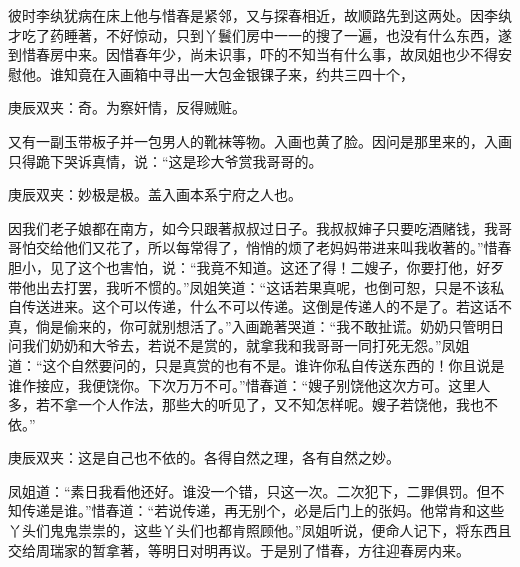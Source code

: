 \begin{parag}
\end{parag}


\begin{parag}
    彼时李纨犹病在床上他与惜春是紧邻，又与探春相近，故顺路先到这两处。因李纨才吃了药睡著，不好惊动，只到丫鬟们房中一一的搜了一遍，也没有什么东西，遂到惜春房中来。因惜春年少，尚未识事，吓的不知当有什么事，故凤姐也少不得安慰他。谁知竟在入画箱中寻出一大包金银锞子来，约共三四十个，\begin{note}庚辰双夹：奇。为察奸情，反得贼赃。\end{note}又有一副玉带板子并一包男人的靴袜等物。入画也黄了脸。因问是那里来的，入画只得跪下哭诉真情，说：“这是珍大爷赏我哥哥的。\begin{note}庚辰双夹：妙极是极。盖入画本系宁府之人也。\end{note}因我们老子娘都在南方，如今只跟著叔叔过日子。我叔叔婶子只要吃酒赌钱，我哥哥怕交给他们又花了，所以每常得了，悄悄的烦了老妈妈带进来叫我收著的。”惜春胆小，见了这个也害怕，说：“我竟不知道。这还了得！二嫂子，你要打他，好歹带他出去打罢，我听不惯的。”凤姐笑道：“这话若果真呢，也倒可恕，只是不该私自传送进来。这个可以传递，什么不可以传递。这倒是传递人的不是了。若这话不真，倘是偷来的，你可就别想活了。”入画跪著哭道：“我不敢扯谎。奶奶只管明日问我们奶奶和大爷去，若说不是赏的，就拿我和我哥哥一同打死无怨。”凤姐道：“这个自然要问的，只是真赏的也有不是。谁许你私自传送东西的！你且说是谁作接应，我便饶你。下次万万不可。”惜春道：“嫂子别饶他这次方可。这里人多，若不拿一个人作法，那些大的听见了，又不知怎样呢。嫂子若饶他，我也不依。”\begin{note}庚辰双夹：这是自己也不依的。各得自然之理，各有自然之妙。\end{note}凤姐道：“素日我看他还好。谁没一个错，只这一次。二次犯下，二罪俱罚。但不知传递是谁。”惜春道：“若说传递，再无别个，必是后门上的张妈。他常肯和这些丫头们鬼鬼祟祟的，这些丫头们也都肯照顾他。”凤姐听说，便命人记下，将东西且交给周瑞家的暂拿著，等明日对明再议。于是别了惜春，方往迎春房内来。
\end{parag}


